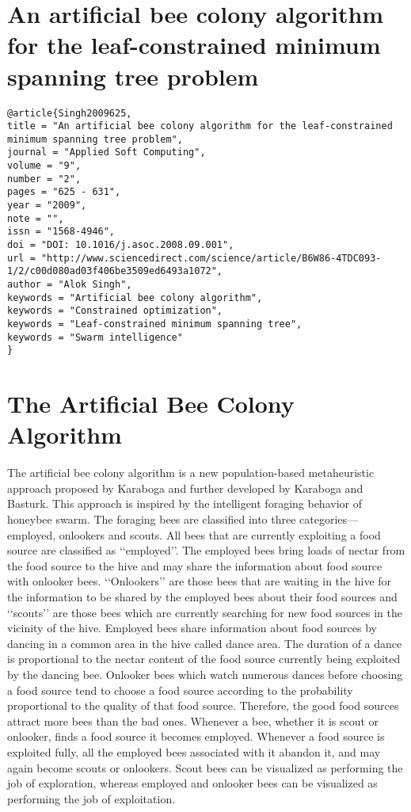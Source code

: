 \documentclass[pdftex,11pt]{article}
\begin{document}
\section{An artificial bee colony algorithm for the leaf-constrained minimum spanning tree problem}
\begin{verbatim}
@article{Singh2009625,
title = "An artificial bee colony algorithm for the leaf-constrained minimum spanning tree problem",
journal = "Applied Soft Computing",
volume = "9",
number = "2",
pages = "625 - 631",
year = "2009",
note = "",
issn = "1568-4946",
doi = "DOI: 10.1016/j.asoc.2008.09.001",
url = "http://www.sciencedirect.com/science/article/B6W86-4TDC093-1/2/c00d080ad03f406be3509ed6493a1072",
author = "Alok Singh",
keywords = "Artificial bee colony algorithm",
keywords = "Constrained optimization",
keywords = "Leaf-constrained minimum spanning tree",
keywords = "Swarm intelligence"
}
\end{verbatim}

\section{The Artificial Bee Colony Algorithm}
The artificial bee colony algorithm is a new population-based metaheuristic approach proposed by Karaboga and further developed by Karaboga and Basturk. This approach is inspired by the intelligent foraging behavior of honeybee swarm. The foraging bees are classified into three categories—employed, onlookers and scouts. All bees that are currently exploiting a food source are classified as ‘‘employed’’. The employed bees bring loads of nectar from the food source to the hive and may share the information about food source with onlooker bees. ‘‘Onlookers’’ are those bees that are waiting in the hive for the information to be shared by the employed bees about their food sources and ‘‘scouts’’ are those bees which are currently searching for new food sources in the vicinity of the hive. Employed bees share information about food sources by dancing in a common area in the hive called dance area. The duration of a dance is proportional to the nectar content of the food source currently being exploited by the dancing bee. Onlooker bees which watch numerous dances before choosing a food source tend to choose a food source according to the probability proportional to the quality of that food source. Therefore, the good food sources attract more bees than the bad ones. Whenever a bee, whether it is scout or onlooker, finds a food source it becomes employed. Whenever a food source is exploited fully, all the employed bees associated with it abandon it, and may again become scouts or onlookers. Scout bees can be visualized as performing the job of exploration, whereas employed and onlooker bees can be visualized as performing the job of exploitation. 
\end{document}
